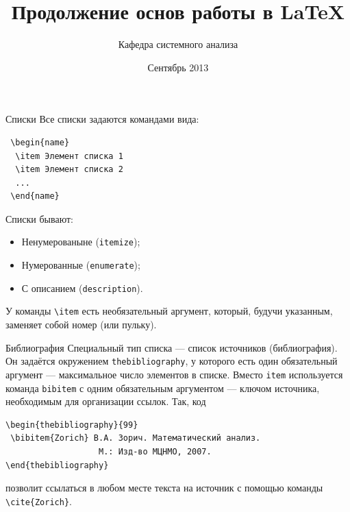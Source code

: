 \documentclass[ mathserif]{beamer}
\title[Вторая лекция по \LaTeX]{Продолжение основ работы в \LaTeX}
\author[Кафедра СА]{Кафедра системного анализа}
\institute{МГУ им. М.В. Ломоносова \\ Факультет вычислительной математики и кибернетики}
\date{Сентябрь 2013}
\begin{document}
\maketitle
%
%
%
\begin{frame}[fragile]{Списки}
 Все списки задаются командами вида:
\begin{verbatim}
 \begin{name}
  \item Элемент списка 1
  \item Элемент списка 2
  ...
 \end{name}
\end{verbatim}
Списки бывают:
\begin{itemize}
 \item Ненумерованыне (\texttt{itemize});
 \item Нумерованные (\texttt{enumerate});
 \item С описанием (\texttt{description}).
\end{itemize}


У команды \verb:\item: есть необязательный аргумент, который, будучи указанным, заменяет собой номер (или пульку).

\end{frame}
%
%
%
\begin{frame}[fragile]{Библиография}
 Специальный тип списка --- список источников (библиография). Он задаётся окружением \texttt{thebibliography}, у которого есть один обязательный аргумент --- максимальное число элементов в списке.
Вместо \texttt{item} используется команда \texttt{bibitem} с одним обязательным аргументом --- ключом источника, необходимым для организации ссылок. Так, код
\begin{verbatim}
\begin{thebibliography}{99}
 \bibitem{Zorich} В.А. Зорич. Математический анализ. 
                   М.: Изд-во МЦНМО, 2007.
\end{thebibliography}
\end{verbatim}
позволит ссылаться в любом месте текста на источник с помощью команды \verb:\cite{Zorich}:.
\end{frame}
\end{document}
